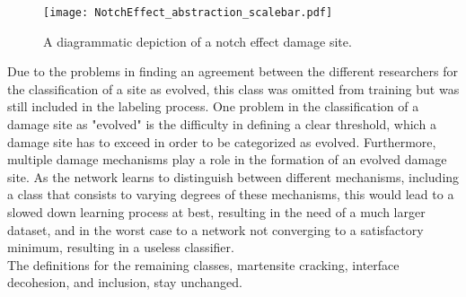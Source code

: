 \begin{figure}[H]
\centering
\texttt{[image: NotchEffect\_abstraction\_scalebar.pdf]}
\caption{A diagrammatic depiction of a notch effect damage site.}
\label{fig:Notch_scalebar}
\end{figure}

Due to the problems in finding an agreement between the different researchers for the classification of a site as evolved, this class was omitted from training but was still included in the labeling process. One problem in the classification of a damage site as "evolved" is the difficulty in defining a clear threshold, which a damage site has to exceed in order to be categorized as evolved. Furthermore, multiple damage mechanisms play a role in the formation of an evolved damage site. As the network learns to distinguish between different mechanisms, including a class that consists to varying degrees of these mechanisms, this would lead to a slowed down learning process at best, resulting in the need of a much larger dataset, and in the worst case to a network not converging to a satisfactory minimum, resulting in a useless classifier.\\ 


The definitions for the remaining classes, martensite cracking, interface decohesion, and inclusion, stay unchanged. 


